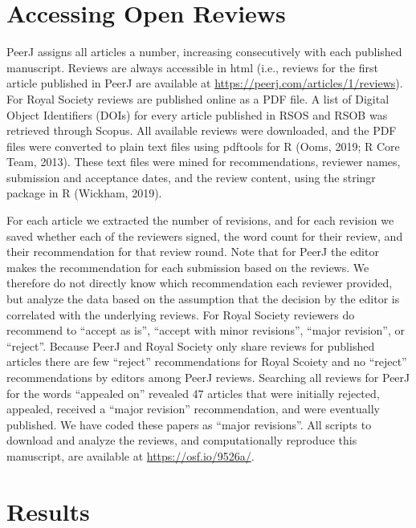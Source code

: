\documentclass[,jou, a4paper,floatsintext]{apa6}
\begin{document}
\hypertarget{accessing-open-reviews}{%
\section{Accessing Open Reviews}\label{accessing-open-reviews}}

PeerJ assigns all articles a number, increasing consecutively with each published manuscript. Reviews are always accessible in html (i.e., reviews for the first article published in PeerJ are available at \url{https://peerj.com/articles/1/reviews}). For Royal Society reviews are published online as a PDF file. A list of Digital Object Identifiers (DOIs) for every article published in RSOS and RSOB was retrieved through Scopus. All available reviews were downloaded, and the PDF files were converted to plain text files using pdftools for R (Ooms, 2019; R Core Team, 2013). These text files were mined for recommendations, reviewer names, submission and acceptance dates, and the review content, using the stringr package in R (Wickham, 2019).

For each article we extracted the number of revisions, and for each revision we saved whether each of the reviewers signed, the word count for their review, and their recommendation for that review round. Note that for PeerJ the editor makes the recommendation for each submission based on the reviews. We therefore do not directly know which recommendation each reviewer provided, but analyze the data based on the assumption that the decision by the editor is correlated with the underlying reviews. For Royal Society reviewers do recommend to \enquote{accept as is}, \enquote{accept with minor revisions}, \enquote{major revision}, or \enquote{reject}. Because PeerJ and Royal Society only share reviews for published articles there are few \enquote{reject} recommendations for Royal Scoiety and no \enquote{reject} recommendations by editors among PeerJ reviews. Searching all reviews for PeerJ for the words \enquote{appealed on} revealed 47 articles that were initially rejected, appealed, received a \enquote{major revision} recommendation, and were eventually published. We have coded these papers as \enquote{major revisions}. All scripts to download and analyze the reviews, and computationally reproduce this manuscript, are available at \url{https://osf.io/9526a/}.

\hypertarget{results}{%
\section{Results}\label{results}}
\end{document}
